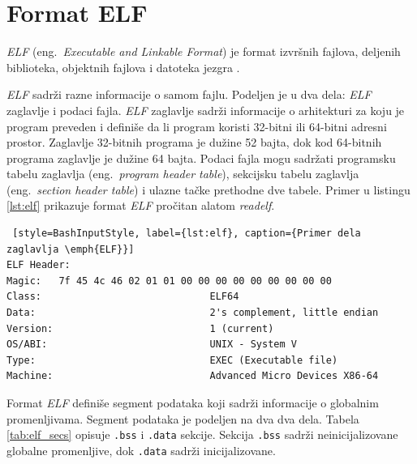 \documentclass[12pt,oneside]{memoir}
\begin{document}

\section{Format ELF}

\emph{ELF} (eng.~\emph{Executable and Linkable Format}) je format izvršnih fajlova, deljenih biblioteka, objektnih fajlova i datoteka jezgra \cite{ELF}.

\emph{ELF} sadrži razne informacije o samom fajlu. Podeljen je u dva dela: \emph{ELF} zaglavlje i podaci fajla. \emph{ELF} zaglavlje sadrži informacije o arhitekturi za koju je program preveden i definiše da li program koristi 32-bitni ili 64-bitni adresni prostor. Zaglavlje 32-bitnih programa je dužine 52 bajta, dok kod 64-bitnih programa zaglavlje je dužine 64 bajta. Podaci fajla mogu sadržati programsku tabelu zaglavlja (eng.~\emph{program header table}), sekcijsku tabelu zaglavlja (eng.~\emph{section header table}) i ulazne tačke prethodne dve tabele. Primer u listingu \ref{lst:elf} prikazuje format \emph{ELF} pročitan alatom \emph{readelf}.

\begin{lstlisting} [style=BashInputStyle, label={lst:elf}, caption={Primer dela zaglavlja \emph{ELF}}]
ELF Header:
Magic:   7f 45 4c 46 02 01 01 00 00 00 00 00 00 00 00 00 
Class:                             ELF64
Data:                              2's complement, little endian
Version:                           1 (current)
OS/ABI:                            UNIX - System V
Type:                              EXEC (Executable file)
Machine:                           Advanced Micro Devices X86-64
\end{lstlisting}

Format \emph{ELF} definiše segment podataka koji sadrži informacije o globalnim promenljivama. Segment podataka je podeljen na dva dva dela. Tabela \ref{tab:elf_secs} opisuje \texttt{.bss} i \texttt{.data} sekcije. Sekcija \texttt{.bss} sadrži neinicijalizovane globalne promenljive, dok \texttt{.data} sadrži inicijalizovane. 
\end{document}

